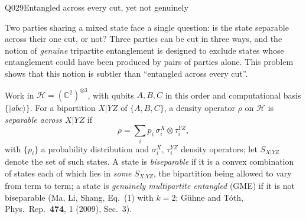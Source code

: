 %
%
\begin{entry}{Q029}{Entangled across every cut, yet not genuinely}


\begin{problem}
Two parties sharing a mixed state face a single question: is the state
separable across their one cut, or not? Three parties can be cut in three
ways, and the notion of \emph{genuine} tripartite entanglement is designed to
exclude states whose entanglement could have been produced by pairs of
parties alone. This problem shows that this notion is subtler than
``entangled across every cut''.

Work in $\mathcal{H} = (\mathbb{C}^2)^{\otimes 3}$, with qubits $A, B, C$ in
this order and computational basis $\{|abc\rangle\}$. For a bipartition
$X|YZ$ of $\{A, B, C\}$, a density operator $\rho$ on $\mathcal{H}$ is
\emph{separable across $X|YZ$} if
\begin{equation}\label{eq:q029-sep}
  \rho = \sum_i p_i\, \sigma_i^{X} \otimes \tau_i^{YZ},
\end{equation}
with $\{p_i\}$ a probability distribution and $\sigma_i^X$, $\tau_i^{YZ}$
density operators; let $S_{X|YZ}$ denote the set of such states. A state is
\emph{biseparable} if it is a convex combination of states each of which lies
in \emph{some} $S_{X|YZ}$, the bipartition being allowed to vary from term to
term; a state is \emph{genuinely multipartite entangled} (GME) if it is not
biseparable (Ma, Li, Shang, Eq.~(1) with $k = 2$; G\"uhne and T\'oth,
Phys.\ Rep.\ \textbf{474}, 1 (2009), Sec.~3).


\end{problem}
\end{entry}
